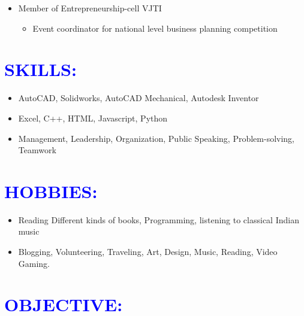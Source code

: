\documentclass{article}
\begin{document}
\begin{multicols}{2}
{\begin{itemize}[noitemsep,nolistsep]
	
	\item Member of Entrepreneurship-cell VJTI
	\begin{itemize}[noitemsep,nolistsep]
		\item Event coordinator for national level business planning competition
	\end{itemize}
\end{itemize}

}
\vspace{5pt}


\section*{\large{\textcolor{blue}{\uppercase{Skills:}}}}

\begin{flushleft}
\begin{itemize}[noitemsep,nolistsep]
	\item AutoCAD, Solidworks, AutoCAD Mechanical, Autodesk Inventor
	\item Excel, C++, HTML, Javascript, Python
	\item Management, Leadership, Organization, Public Speaking, Problem-solving, Teamwork
\end{itemize}
\end{flushleft}
\vspace{5pt}

\section*{\large{\textcolor{blue}{\uppercase{Hobbies:}}}}

\begin{flushleft}
\begin{itemize}[noitemsep,nolistsep]
	\item Reading Different kinds of books, Programming, listening to classical Indian music
	\item Blogging, Volunteering, Traveling, Art, Design, Music, Reading, Video Gaming.
\end{itemize}
\end{flushleft}
\vspace{5pt}
\section*{\large{\textcolor{blue}{\uppercase{objective:}}}}


\end{multicols}
\end{document}
